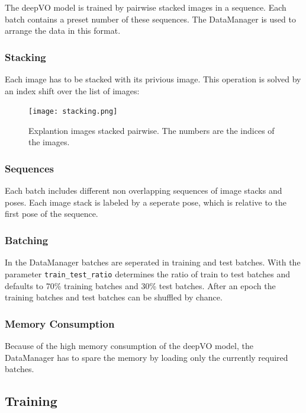 \documentclass[a4paper,11pt]{article}
\begin{document}
The deepVO model is trained by pairwise stacked images in a sequence. Each batch contains a preset number of these sequences. The DataManager is used to arrange the data in this format.

\subsubsection{Stacking}
Each image has to be stacked with its privious image. This operation is solved by an index shift over the list of images:


\begin{figure}[tbh]
    \centering
    \texttt{[image: stacking.png]}
    \caption{Explantion images stacked pairwise. The numbers are the indices of the images.}
    \label{fig:image_stacking}
\end{figure}

\subsubsection{Sequences}
Each batch includes different non overlapping sequences of image stacks and
poses. Each image stack is labeled by a seperate pose, which is relative to the
first pose of the sequence.

\subsubsection{Batching}
In the DataManager batches are seperated in training and test batches. With the
parameter \texttt{train\_test\_ratio} determines the ratio of train to test
batches and defaults to 70\% training batches and 30\% test batches. After an
epoch the training batches and test batches can be shuffled by chance.

\subsubsection{Memory Consumption}
Because of the high memory consumption of the deepVO model, the DataManager has
to spare the memory by loading only the currently required batches.



\subsection{Training}
\label{sec:evaluation:training}
\end{document}
